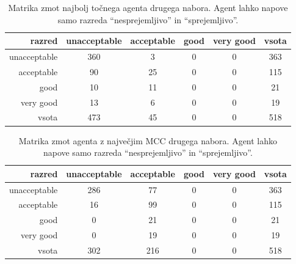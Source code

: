 \begin{table}[H]
    \centering
    \begin{tabular}{||rccccc||}
        \hline
        razred       & unacceptable & acceptable & good & very good & vsota \\ \hline
        unacceptable & 360          & 3          & 0    & 0         & 363   \\ \hline
        acceptable   & 90           & 25         & 0    & 0         & 115   \\ \hline
        good         & 10           & 11         & 0    & 0         & 21    \\ \hline
        very good    & 13           & 6          & 0    & 0         & 19    \\ \hline
        vsota        & 473          & 45         & 0    & 0         & 518   \\ \hline
    \end{tabular}
    \caption{Matrika zmot najbolj točnega agenta drugega nabora. Agent lahko napove samo razreda \enquote{nesprejemljivo} in \enquote{sprejemljivo}.}
    \label{tab:car_acc_2}
\end{table}

\begin{table}[H]
    \centering
    \begin{tabular}{||rccccc||}
        \hline
        razred       & unacceptable & acceptable & good & very good & vsota \\ \hline
        unacceptable & 286          & 77         & 0    & 0         & 363   \\ \hline
        acceptable   & 16           & 99         & 0    & 0         & 115   \\ \hline
        good         & 0            & 21         & 0    & 0         & 21    \\ \hline
        very good    & 0            & 19         & 0    & 0         & 19    \\ \hline
        vsota        & 302          & 216        & 0    & 0         & 518   \\ \hline
    \end{tabular}
    \caption{Matrika zmot agenta z največjim MCC drugega nabora. Agent lahko napove samo razreda \enquote{nesprejemljivo} in \enquote{sprejemljivo}.}
    \label{tab:car_mcc_2}
\end{table}

